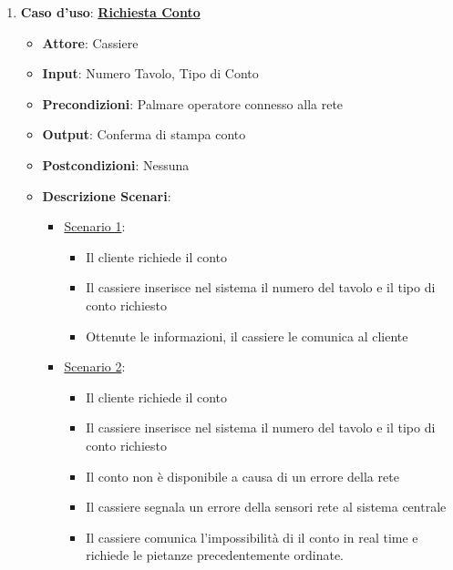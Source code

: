 \begin{enumerate}
    \item {\bf Caso d'uso}: \uline{{\bf Richiesta Conto}}
    \begin{itemize}
        \item {\bf Attore}: Cassiere
        \item {\bf Input}: Numero Tavolo, Tipo di Conto
        \item {\bf Precondizioni}: Palmare operatore connesso alla rete
        \item {\bf Output}: Conferma di stampa conto
        \item {\bf Postcondizioni}: Nessuna
        \item {\bf Descrizione Scenari}:
        \begin{itemize}
            \item \uline{Scenario 1}:
            \begin{itemize}
                \item Il cliente richiede il conto
                \item Il cassiere inserisce nel sistema il numero del tavolo e il 
                    tipo di conto richiesto
                \item Ottenute le informazioni, il cassiere le comunica al cliente
            \end{itemize}
            \item \uline{Scenario 2}:
            \begin{itemize}
                \item Il cliente richiede il conto
                \item Il cassiere inserisce nel sistema il numero del tavolo e il 
                    tipo di conto richiesto
                \item Il conto non \`e disponibile a causa di un errore della rete
                \item Il cassiere segnala un errore della sensori rete al sistema centrale
                \item Il cassiere comunica l'impossibilit\`a di il conto in real time e richiede
                    le pietanze precedentemente ordinate.
            \end{itemize}
        \end{itemize}
    \end{itemize}


\end{enumerate}
